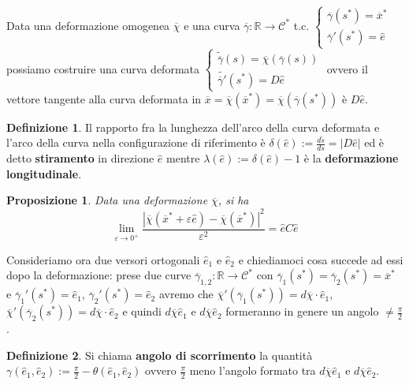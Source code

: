 \documentclass{book}
\theoremstyle{plain}
\theoremstyle{plain}
\theoremstyle{plain}
\theoremstyle{plain}
\theoremstyle{plain}
\newtheorem{prop}{Proposizione}[chapter]
\theoremstyle{definition}
\newtheorem{defi}{Definizione}[chapter]
\theoremstyle{remark}
\theoremstyle{definition}
\begin{document}
\noindent Data una deformazione omogenea $\overline{\chi}$ e una curva $\overline{\gamma}:\mathbb{R}\to\mathcal{C}^*$ t.c.
$\begin{cases}
    \overline{\gamma}(s^*)=\overline{x}^*\\
    \overline{\gamma}'(s^*)=\hat{e}
\end{cases}$
possiamo costruire una curva deformata
$\begin{cases}
    \widetilde{\overline{\gamma}}(s)=\overline{\chi}(\overline{\gamma}(s))\\
    \widetilde{\overline{\gamma}'}(s^*)=D\hat{e}
\end{cases}$
ovvero il vettore tangente alla curva deformata in $\overline{x}=\overline{\chi}(\overline{x}^*)=\overline{\chi}(\overline{\gamma}(s^*))$ è $D\hat{e}$.

\begin{defi}
    Il rapporto fra la lunghezza dell'arco della curva deformata e l'arco della curva nella configurazione di riferimento è $\delta(\hat{e}):=\frac{d\tilde{s}}{ds}=|D\hat{e}|$ ed è detto \textbf{stiramento} in direzione $\hat{e}$ mentre $\lambda(\hat{e}) :=\delta(\hat{e})-1$ è la \textbf{deformazione longitudinale}.
\end{defi}

\begin{prop}
    Data una deformazione $\overline{\chi}$, si ha
    \begin{displaymath}
        \lim_{\varepsilon\to 0^+} \frac{|\overline{\chi}(\overline{x}^*+\varepsilon\hat{e})-\overline{\chi}(\overline{x}^*)|^2}{\varepsilon^2}=\hat{e}C\hat{e}
    \end{displaymath}
\end{prop}

\noindent Consideriamo ora due versori ortogonali $\hat{e}_1$ e $\hat{e}_2$ e chiediamoci cosa succede ad essi dopo la deformazione: prese due curve $\overline{\gamma}_{1,2}:\mathbb{R}\to\mathcal{C}^*$ con $\overline{\gamma}_1(s^*)=\overline{\gamma}_2(s^*)=\overline{x}^*$ e $\overline{\gamma}_1'(s^*)=\hat{e}_1$, $\overline{\gamma}_2'(s^*)=\hat{e}_2$ avremo che $\overline{\chi}'(\overline{\gamma}_1(s^*))=d\overline{\chi}\cdot\hat{e}_1$, $\overline{\chi}'(\overline{\gamma}_2(s^*))=d\overline{\chi}\cdot\hat{e}_2$ e quindi $d\overline{\chi}\hat{e}_1$ e $d\overline{\chi}\hat{e}_2$ formeranno in genere un angolo $\neq \frac{\pi}{2}$.

\begin{defi}
    Si chiama \textbf{angolo di scorrimento} la quantità $\gamma(\hat{e}_1,\hat{e}_2):= \frac{\pi}{2}-\theta(\hat{e}_1,\hat{e}_2)$ ovvero $\frac{\pi}{2}$ meno l'angolo formato tra $d\overline{\chi}\hat{e}_1$ e $d\overline{\chi}\hat{e}_2$.
\end{defi}
\end{document}
